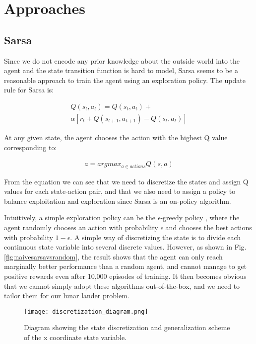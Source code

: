 \documentclass[10pt, conference]{IEEEtran}
\begin{document}
\section{Approaches}
\subsection{Sarsa}
Since we do not encode any prior knowledge about the outside world into the agent and the state transition function is hard to model, Sarsa \cite{kochenderfer2015decision} seems to be a reasonable approach to train the agent using an exploration policy. The update rule for Sarsa is:

\begin{multline}
    Q(s_t, a_t) = Q(s_t, a_t) + \\
\alpha [r_t + Q(s_{t+1}, a_{t+1}) - Q(s_t, a_t)]
\end{multline}

At any given state, the agent chooses the action with the highest Q value corresponding to:

\begin{equation}
\begin{aligned}
    a = argmax_{a \in actions} Q(s, a)
\end{aligned} 
\end{equation}

From the equation we can see that we need to discretize the states and assign Q values for each state-action pair, and that we also need to assign a policy to balance exploitation and exploration since Sarsa is an on-policy algorithm.

Intuitively, a simple exploration policy can be the $\epsilon$-greedy policy \cite{RodriguesGomes:2009:DAM:1553374.1553422}, where the agent randomly chooses an action with probability $\epsilon$ and chooses the best actions with probability $1 - \epsilon$. A simple way of discretizing the state is to divide each continuous state variable into several discrete values. However, as shown in Fig. \ref{fig:naivesarsavsrandom}, the result shows that the agent can only reach marginally better performance than a random agent, and cannot manage to get positive rewards even after 10,000 episodes of training. It then becomes obvious that we cannot simply adopt these algorithms out-of-the-box, and we need to tailor them for our lunar lander problem.



\begin{figure}[!t]
    \centering
    \texttt{[image: discretization\_diagram.png]}
    \caption{Diagram showing the state discretization and generalization scheme of the x coordinate state variable.}
    \label{fig:discretization}
\end{figure}
\end{document}
